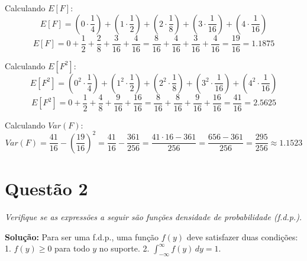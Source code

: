 \documentclass[12pt, a4paper]{article}
\begin{document}
Calculando $E[F]$:
$$ E[F] = (0 \cdot \frac{1}{4}) + (1 \cdot \frac{1}{2}) + (2 \cdot \frac{1}{8}) + (3 \cdot \frac{1}{16}) + (4 \cdot \frac{1}{16}) $$
$$ E[F] = 0 + \frac{1}{2} + \frac{2}{8} + \frac{3}{16} + \frac{4}{16} = \frac{8}{16} + \frac{4}{16} + \frac{3}{16} + \frac{4}{16} = \frac{19}{16} = 1.1875 $$

Calculando $E[F^2]$:
$$ E[F^2] = (0^2 \cdot \frac{1}{4}) + (1^2 \cdot \frac{1}{2}) + (2^2 \cdot \frac{1}{8}) + (3^2 \cdot \frac{1}{16}) + (4^2 \cdot \frac{1}{16}) $$
$$ E[F^2] = 0 + \frac{1}{2} + \frac{4}{8} + \frac{9}{16} + \frac{16}{16} = \frac{8}{16} + \frac{8}{16} + \frac{9}{16} + \frac{16}{16} = \frac{41}{16} = 2.5625 $$

Calculando $Var(F)$:
$$ Var(F) = \frac{41}{16} - \left(\frac{19}{16}\right)^2 = \frac{41}{16} - \frac{361}{256} = \frac{41 \cdot 16 - 361}{256} = \frac{656 - 361}{256} = \frac{295}{256} \approx 1.1523 $$

\newpage

\section*{Questão 2}
\textit{Verifique se as expressões a seguir são funções densidade de probabilidade (f.d.p.).}

\textbf{Solução:}
Para ser uma f.d.p., uma função $f(y)$ deve satisfazer duas condições:
1. $f(y) \ge 0$ para todo $y$ no suporte.
2. $\int_{-\infty}^{\infty} f(y) \,dy = 1$.
\end{document}

